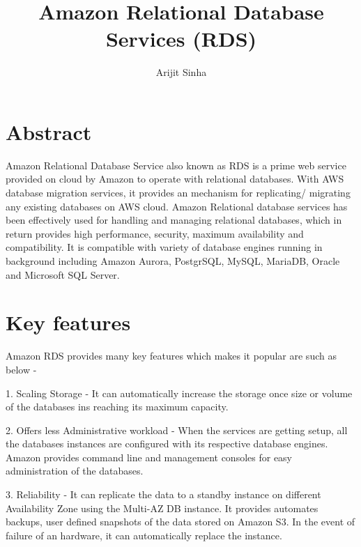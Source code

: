 
\title{Amazon Relational Database Services (RDS)}

\author{Arijit Sinha}

\renewcommand{\shortauthors}{A.Sinha}


\maketitle

\section{Abstract}

Amazon Relational Database Service also known as RDS is a prime web service 
provided on cloud by Amazon to operate with relational databases. 
With AWS database migration services, it provides an mechanism for 
replicating/ migrating any existing databases on AWS cloud.
Amazon Relational database services has been effectively used for  handling
and managing relational databases, which in return provides high performance, 
security, maximum availability and compatibility. 
It is compatible with variety of database engines running in background 
including Amazon Aurora, PostgrSQL, MySQL, MariaDB, Oracle and 
Microsoft SQL Server.

\section{Key features}

Amazon RDS provides many key features which makes it popular are such as below - 

1. Scaling Storage - It can automatically increase the storage once size or 
volume of the databases ins reaching its maximum capacity.

2. Offers less Administrative workload - When the services are getting setup, 
all the databases instances are configured with its respective database engines. 
Amazon provides command line and management consoles for easy administration 
of the databases.

3. Reliability - It can replicate the data to a standby instance on different 
Availability Zone using the Multi-AZ DB instance. It provides  automates 
backups, user defined snapshots of the data stored on Amazon S3. In the event 
of failure of an hardware, it can automatically replace the instance.

